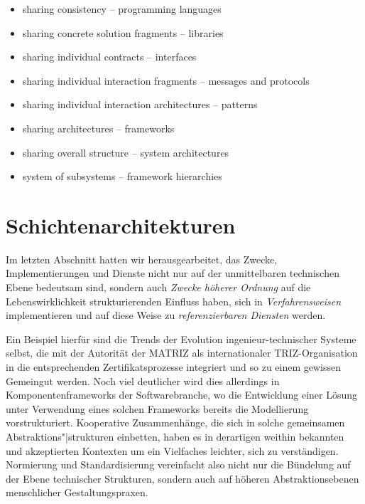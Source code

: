 \documentclass[11pt,a4paper]{article}
\begin{document}
\begin{itemize}\itemsep0pt
\item sharing consistency -- programming languages
\item sharing concrete solution fragments -- libraries
\item sharing individual contracts -- interfaces
\item sharing individual interaction fragments -- messages and protocols
\item sharing individual interaction architectures -- patterns
\item sharing architectures -- frameworks
\item sharing overall structure -- system architectures
\item system of subsystems -- framework hierarchies
\end{itemize}

\section{Schichtenarchitekturen}

Im letzten Abschnitt hatten wir herausgearbeitet, das Zwecke,
Implementierungen und Dienste nicht nur auf der unmittelbaren technischen
Ebene bedeutsam sind, sondern auch \emph{Zwecke höherer Ordnung} auf die
Lebenswirklichkeit strukturierenden Einfluss haben, sich in
\emph{Verfahrensweisen} implementieren und auf diese Weise zu
\emph{referenzierbaren Diensten} werden.

Ein Beispiel hierfür sind die Trends der Evolution ingenieur-technischer
Systeme \cite{TESE2018} selbst, die mit der Autorität der MATRIZ als
internationaler TRIZ-Organisation in die entsprechenden Zertifikatsprozesse
integriert und so zu einem gewissen Gemeingut werden.  Noch viel deutlicher
wird dies allerdings in Komponentenframeworks der Softwarebranche, wo die
Entwicklung einer Lösung unter Verwendung eines solchen Frameworks bereits die
Modellierung vorstrukturiert. Kooperative Zusammenhänge, die sich in solche
gemeinsamen Abstraktions"|strukturen einbetten, haben es in derartigen weithin
bekannten und akzeptierten Kontexten um ein Vielfaches leichter, sich zu
verständigen.  Normierung und Standardisierung vereinfacht also nicht nur die
Bündelung auf der Ebene technischer Strukturen, sondern auch auf höheren
Abstraktionsebenen menschlicher Gestaltungspraxen.
\end{document}
